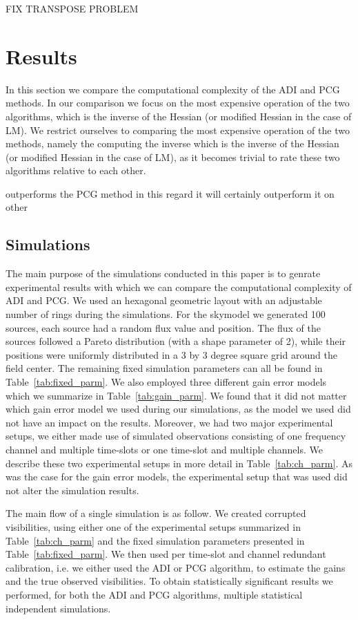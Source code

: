 \documentclass[useAMS,usenatbib]{mn2e}
\begin{document}
FIX TRANSPOSE PROBLEM

\section{Results}
In this section we compare the computational complexity of the ADI \citep{Marthi2014} and PCG \citep{Liu2010} methods. In our comparison we focus on the most 
expensive operation of the two algorithms, which is the inverse of the Hessian (or modified Hessian in the case of LM). We restrict ourselves to comparing the most expensive operation of the two methods, namely the computing the inverse which is the inverse of the Hessian (or modified Hessian in the case of LM), as
it becomes trivial to rate these two algorithms relative to each other.

outperforms the PCG method in this regard it will certainly outperform it on other  


\subsection{Simulations}
The main purpose of the simulations conducted in this paper is to genrate experimental results with which we can compare the computational complexity of ADI and PCG. We used an hexagonal geometric layout with an adjustable number of rings during the 
simulations. For the skymodel we generated 100 sources, each source had a random flux value and position. The flux of the sources followed a Pareto distribution (with a shape parameter of 2), while their positions were uniformly 
distributed in a 3 by 3 degree square grid around the field center. The remaining fixed simulation parameters can all be found in Table~\ref{tab:fixed_parm}. 
We also employed three different gain error models which we summarize in Table~\ref{tab:gain_parm}. We found that it did not matter which gain error model we used during
our simulations, as the model we used did not have an impact on the results. Moreover, we had two major experimental setups, we either made use of simulated observations consisting of one frequency channel and multiple time-slots or one time-slot and multiple channels.
We describe these two experimental setups in more detail in Table~\ref{tab:ch_parm}. As was the case for the gain error models, the experimental setup 
that was used did not alter the simulation results. 

The main flow of a single simulation is as follow. We created corrupted visibilities, using either one of the experimental setups summarized in Table~\ref{tab:ch_parm} and
the fixed simulation parameters presented in Table~\ref{tab:fixed_parm}. We then used per time-slot and channel redundant calibration, i.e. we either used the ADI or PCG algorithm, to 
estimate the gains and the true observed visibilities. To obtain statistically significant results we performed, for both the ADI and PCG algorithms, multiple statistical independent simulations. 
\end{document}
